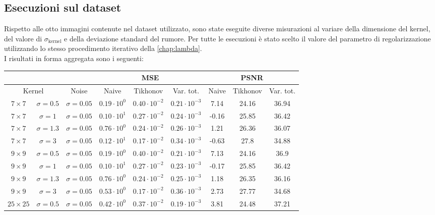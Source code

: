 \documentclass[11pt]{article}
\begin{document}
\subsection{Esecuzioni sul dataset}
Rispetto alle otto immagini contenute nel dataset utilizzato, sono state eseguite diverse misurazioni al variare della dimensione del kernel, del valore di $\sigma_{\text{kernel}}$ e della deviazione standard del rumore. 
Per tutte le esecuzioni è stato scelto il valore del parametro di regolarizzazione utilizzando lo stesso procedimento iterativo della \autoref{chap:lambda}.\\
I risultati in forma aggregata sono i seguenti:
\begin{center}
    \begin{tabular}{ |cc|c|c|c|c|c|c|c| }
    \hline
    \multicolumn{3}{|c|}{} & \multicolumn{3}{c|}{MSE} & \multicolumn{3}{c|}{PSNR} \\
    \hline
    \multicolumn{2}{|c|}{Kernel} & Noise & Naive & Tikhonov & Var. tot. & Naive & Tikhonov & Var. tot. \\ 
    \hline
	$7 \times 7$ & $\sigma=0.5$ & $\sigma=0.05$ & $0.19 \cdot 10^{0}$ & $0.40 \cdot 10^{-2}$ & $0.21 \cdot 10^{-3}$ & 7.14 & 24.16 & 36.94 \\
	$7 \times 7$ & $\sigma=1$ & $\sigma=0.05$ & $0.10 \cdot 10^{1}$ & $0.27 \cdot 10^{-2}$ & $0.24 \cdot 10^{-3}$ & -0.16 & 25.85 & 36.42 \\
    $7 \times 7$ & $\sigma=1.3$ & $\sigma=0.05$ & $0.76 \cdot 10^{0}$ & $0.24 \cdot 10^{-2}$ & $0.26 \cdot 10^{-3}$ & 1.21 & 26.36 & 36.07 \\
    $7 \times 7$ & $\sigma=3$ & $\sigma=0.05$ & $0.12 \cdot 10^{1}$ & $0.17 \cdot 10^{-2}$ & $0.34 \cdot 10^{-3}$ & -0.63 & 27.8 & 34.88 \\
	\hline
    $9 \times 9$ & $\sigma=0.5$ & $\sigma=0.05$ & $0.19 \cdot 10^{0}$ & $0.40 \cdot 10^{-2}$ & $0.21 \cdot 10^{-3}$ & 7.13 & 24.16 & 36.9 \\
	$9 \times 9$ & $\sigma=1$ & $\sigma=0.05$ & $0.10 \cdot 10^{1}$ & $0.27 \cdot 10^{-2}$ & $0.23 \cdot 10^{-3}$ & -0.17 & 25.85 & 36.42 \\
	$9 \times 9$ & $\sigma=1.3$ & $\sigma=0.05$ & $0.76 \cdot 10^{0}$ & $0.24 \cdot 10^{-2}$ & $0.25 \cdot 10^{-3}$ & 1.18 & 26.35 & 36.16 \\
    $9 \times 9$ & $\sigma=3$ & $\sigma=0.05$ & $0.53 \cdot 10^{0}$ & $0.17 \cdot 10^{-2}$ & $0.36 \cdot 10^{-3}$ & 2.73 & 27.77 & 34.68 \\
    \hline
    $25 \times 25$ & $\sigma=0.5$ & $\sigma=0.05$ & $0.42 \cdot 10^{0}$ & $0.37 \cdot 10^{-2}$ & $0.19 \cdot 10^{-3}$ & 3.81 & 24.48 & 37.21 \\

\end{tabular}
\end{center}
\end{document}
